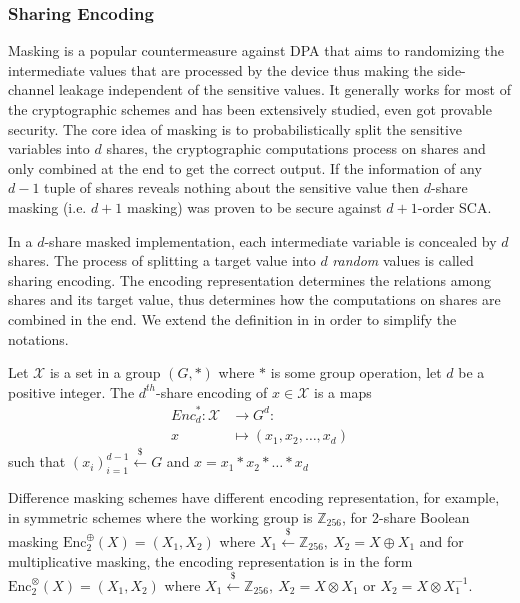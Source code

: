 \documentclass{llncs}
\begin{document}
\subsubsection*{Sharing Encoding}
Masking is a popular countermeasure against DPA that aims to randomizing the intermediate values that are processed by the device thus making the side-channel leakage independent of the sensitive values. It generally works for most of the cryptographic schemes and has been extensively studied, even got provable security. The core idea of masking is to probabilistically split the sensitive variables into $d$ shares, the cryptographic computations process on shares and only combined at the end to get the correct output. If the information of any $d-1$ tuple of shares reveals nothing about the sensitive value then $d$-share masking (i.e. $d+1$ masking) was proven to be secure against $d+1$-order SCA.

In a $d$-share masked implementation, each intermediate variable is concealed by $d$ shares. The process of splitting a target value into $d$ \textit{random} values is called sharing encoding. The encoding representation determines the relations among shares and its target value, thus determines how the computations on shares are combined in the end. We extend the definition in \cite{Prouff13} in order to simplify the notations.
\begin{definition}
	Let $\mathcal{X}$ is a set in a group $(G, \ast)$ where $\ast$ is some group operation, let $d$ be a positive integer. The $d^{th}$-share encoding of $x \in \mathcal{X}$ is a maps
	\begin{align*} 
		{Enc}^{\ast}_d: \mathcal{X} &\rightarrow G^d:\\ 
		x &\mapsto (x_1, x_2, \dots, x_d)
	\end{align*}
such that $(x_i)_{i=1}^{d-1} \overset{\$}{\leftarrow} G$ and $x = x_1 \ast x_2 \ast \dots \ast x_d$	
\end{definition}
Difference masking schemes have different encoding representation, for example, in symmetric schemes where the working group is $\mathbb{Z}_{256}$, for 2-share Boolean masking $\text{Enc}^{\oplus}_{2}(X) = (X_1, X_2)$ where $X_1 \overset{\$}{\leftarrow} \mathbb{Z}_{256},\ X_2 = X \oplus X_1$ and for multiplicative masking, the encoding representation is in the form $\text{Enc}^{\otimes}_{2}(X) = (X_1, X_2)$ where $X_1 \overset{\$}{\leftarrow} \mathbb{Z}_{256},\ X_2 = X \otimes X_1 \text{ or } X_2 = X \otimes X_1^{-1}$.
\end{document}

